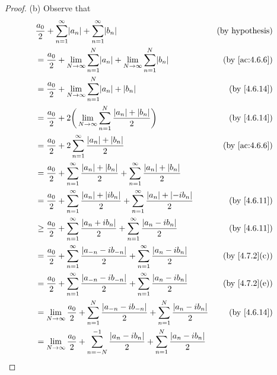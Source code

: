 \begin{proof}{(b)}
  Observe that
  \begin{align*}
     & \frac{a_0}{2} + \sum_{n = 1}^\infty \abs{a_n} + \sum_{n = 1}^\infty \abs{b_n}                                                             & \text{(by hypothesis)}      \\
     & = \frac{a_0}{2} + \lim_{N \to \infty} \sum_{n = 1}^N \abs{a_n} + \lim_{N \to \infty} \sum_{n = 1}^N \abs{b_n}                             & \text{(by \cref{ac:4.6.6})} \\
     & = \frac{a_0}{2} + \lim_{N \to \infty} \sum_{n = 1}^N \abs{a_n} + \abs{b_n}                                                                & \text{(by \cref{4.6.14})}   \\
     & = \frac{a_0}{2} + 2 \bigg(\lim_{N \to \infty} \sum_{n = 1}^N \frac{\abs{a_n} + \abs{b_n}}{2}\bigg)                                        & \text{(by \cref{4.6.14})}   \\
     & = \frac{a_0}{2} + 2 \sum_{n = 1}^\infty \frac{\abs{a_n} + \abs{b_n}}{2}                                                                   & \text{(by \cref{ac:4.6.6})} \\
     & = \frac{a_0}{2} + \sum_{n = 1}^\infty \frac{\abs{a_n} + \abs{b_n}}{2} + \sum_{n = 1}^\infty \frac{\abs{a_n} + \abs{b_n}}{2}                                             \\
     & = \frac{a_0}{2} + \sum_{n = 1}^\infty \frac{\abs{a_n} + \abs{i b_n}}{2} + \sum_{n = 1}^\infty \frac{\abs{a_n} + \abs{-i b_n}}{2}          & \text{(by \cref{4.6.11})}   \\
     & \geq \frac{a_0}{2} + \sum_{n = 1}^\infty \frac{\abs{a_n + i b_n}}{2} + \sum_{n = 1}^\infty \frac{\abs{a_n - i b_n}}{2}                    & \text{(by \cref{4.6.11})}   \\
     & = \frac{a_0}{2} + \sum_{n = 1}^\infty \frac{\abs{a_{-n} - i b_{-n}}}{2} + \sum_{n = 1}^\infty \frac{\abs{a_n - i b_n}}{2}                 & \text{(by \cref{4.7.2}(c))} \\
     & = \frac{a_0}{2} + \sum_{n = 1}^\infty \frac{\abs{a_{-n} - i b_{-n}}}{2} + \sum_{n = 1}^\infty \frac{\abs{a_n - i b_n}}{2}                 & \text{(by \cref{4.7.2}(e))} \\
     & = \lim_{N \to \infty} \frac{a_0}{2} + \sum_{n = 1}^N \frac{\abs{a_{-n} - i b_{-n}}}{2} + \sum_{n = 1}^N \frac{\abs{a_n - i b_n}}{2}       & \text{(by \cref{4.6.14})}   \\
     & = \lim_{N \to \infty} \frac{a_0}{2} + \sum_{n = -N}^{-1} \frac{\abs{a_n - i b_n}}{2} + \sum_{n = 1}^N \frac{\abs{a_n - i b_n}}{2}                                       \\

\end{align*}
\end{proof}
